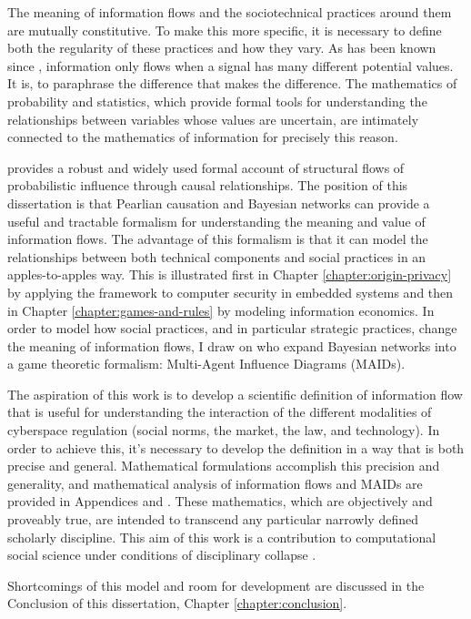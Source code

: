 \documentclass[../thesis.tex]{subfiles}
\begin{document}
 The meaning of information flows and the sociotechnical
 practices around them are mutually constitutive.
 To make this more specific, it is necessary to define both
 the regularity of these practices and how they vary.
 As has been known since \citet{shannon1948mathematical},
 information only flows when a signal has many different
 potential values. It is, to paraphrase \citet{bateson1972steps}
 the difference that makes the difference.
 The mathematics of probability and statistics, which provide
 formal tools for understanding the relationships between variables
 whose values are uncertain, are intimately connected to the
 mathematics of information for precisely this reason.

 \citet{pearl2009causality} provides a robust and widely used
 formal account of structural flows of probabilistic influence
 through causal relationships.
 The position of this dissertation is that Pearlian causation
 and Bayesian networks can provide a useful and tractable
 formalism for understanding the meaning and value of information
 flows.
 The advantage of this formalism is that it can model the
 relationships between both technical components and social
 practices in an apples-to-apples way.
 This is illustrated first in Chapter \ref{chapter:origin-privacy}
 by applying the framework to computer security in embedded systems
 and then in Chapter \ref{chapter:games-and-rules} by modeling
 information economics.
 In order to model how social practices, and in particular strategic
 practices, change the meaning of
 information flows, I draw on \citet{koller2003multi} who expand
 Bayesian networks into a game theoretic formalism: 
 Multi-Agent Influence Diagrams (MAIDs).

 The aspiration of this work is to develop a scientific definition
 of information flow that is useful for understanding the
 interaction of the different modalities of cyberspace regulation
 (social norms, the market, the law, and technology).
 In order to achieve this, it's necessary to develop the definition
 in a way that is both precise and general.
 Mathematical formulations accomplish this precision and generality,
 and mathematical analysis of information flows and MAIDs are
 provided in Appendices \cite{appendix:information-theory-theorems}
 and \cite{appendix:maid}.
 These mathematics, which are objectively and proveably true,
 are intended to transcend any particular
 narrowly defined scholarly discipline.
 This aim of this work is a contribution to computational social
 science \citep{benthall2016philosophy} under conditions of
 disciplinary collapse \citep{benthall2015designing}.

 Shortcomings of this model and room for development
 are discussed in the Conclusion of this
 dissertation, Chapter \ref{chapter:conclusion}.
 
 
\end{document}
